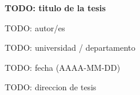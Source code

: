 \begin{titlepage}
    \centering
    {\LARGE \bfseries TODO: titulo de la tesis \par}
    \vspace{1.5cm}
    {\large TODO: autor/es \par}
    \vspace{0.5cm}
    {\large TODO: universidad / departamento \par}
    \vspace{0.5cm}
    {\large TODO: fecha (AAAA-MM-DD) \par}
    \vfill
    {\large TODO: direccion de tesis \par}
\end{titlepage}

\begin{abstract}
TODO: resumen.
\end{abstract}

\tableofcontents

